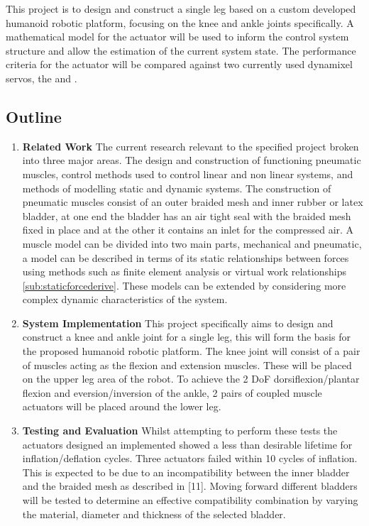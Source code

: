 \documentclass[11pt,a4paper]{article}
\begin{document}
This project is to design and construct a single leg based on a custom developed humanoid robotic platform, focusing on the knee and ankle joints specifically. A mathematical model for the actuator will be used to inform the control system structure and allow the estimation of the current system state. The performance criteria for the actuator will be compared against two currently used dynamixel servos, the \cite{robotis_mx106} and \cite{robotis}.

\newpage
\subsection{Outline}
\label{sub:outline}
\begin{enumerate}
\item \textbf{Related Work} The current research relevant to the specified project broken into three major areas. The design and construction of functioning pneumatic muscles, control methods used to control linear and non linear systems, and methods of modelling static and dynamic systems. The construction of pneumatic muscles consist of an outer braided mesh and inner rubber or latex bladder, at one end the bladder has an air tight seal with the braided mesh fixed in place and at the other it contains an inlet for the compressed air. A muscle model can be divided into two main parts, mechanical and pneumatic, a model can be described in terms of its static relationships between forces using methods such as finite element analysis or virtual work relationships \cref{sub:staticforcederive}. These models can be extended by considering more complex dynamic characteristics of the system.
\item \textbf{System Implementation} This project specifically aims to design and construct a knee and ankle joint for a single leg, this will form the basis for the proposed humanoid robotic platform. The knee joint will consist of a pair of muscles acting as the flexion and extension muscles.  These will be placed on the upper leg area of the robot. To achieve the 2 DoF dorsiflexion/plantar flexion and eversion/inversion of the ankle, 2 pairs of coupled muscle actuators will be placed around the lower leg.
\item \textbf{Testing and Evaluation} Whilst attempting to perform these tests the actuators designed an implemented showed  a  less  than  desirable  lifetime  for  inflation/deflation  cycles.   Three  actuators failed within 10 cycles of inflation.  This is expected to be due to an incompatibility between the inner bladder and the braided mesh as described in [11].  Moving forward different  bladders  will  be  tested  to  determine  an  effective  compatibility  combination by  varying  the  material,  diameter  and  thickness  of  the  selected  bladder.

\end{enumerate}
\end{document}
